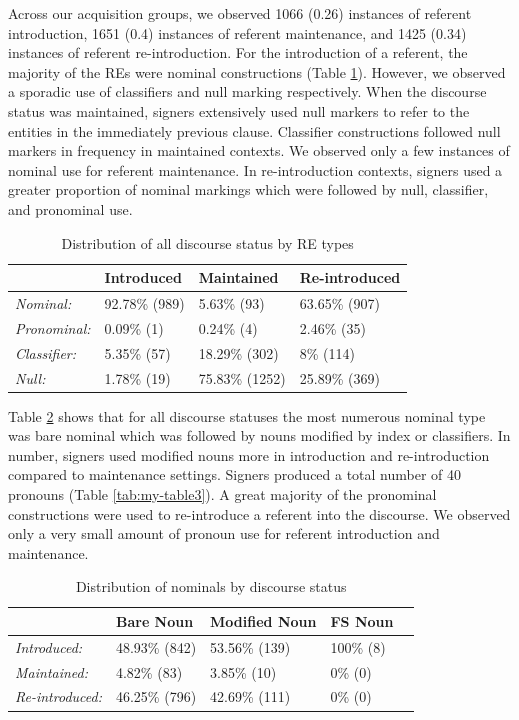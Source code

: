 \documentclass[]{elsarticle} %
\begin{document}
Across our acquisition groups, we observed 1066 (0.26) instances of
referent introduction, 1651 (0.4) instances of referent maintenance, and
1425 (0.34) instances of referent re-introduction. For the introduction
of a referent, the majority of the REs were nominal constructions (Table
\ref{tab:my-table}). However, we observed a sporadic use of classifiers
and null marking respectively. When the discourse status was maintained,
signers extensively used null markers to refer to the entities in the
immediately previous clause. Classifier constructions followed null
markers in frequency in maintained contexts. We observed only a few
instances of nominal use for referent maintenance. In re-introduction
contexts, signers used a greater proportion of nominal markings which
were followed by null, classifier, and pronominal use.

\begin{table}
\small
\caption{Distribution of all discourse status by RE types}
\label{tab:my-table}
\begin{tabular}{llll}
\hline
                     & Introduced    & Maintained     & Re-introduced \\ \hline
\textit{Nominal:}    & 92.78\% (989) & 5.63\% (93)    & 63.65\% (907) \\
\textit{Pronominal:} & 0.09\% (1)    & 0.24\% (4)     & 2.46\% (35)   \\
\textit{Classifier:} & 5.35\% (57)   & 18.29\% (302)  & 8\% (114)     \\
\textit{Null:}       & 1.78\% (19)   & 75.83\% (1252) & 25.89\% (369) \\ \hline
\end{tabular}%
\end{table}

Table \ref{tab:my-table2} shows that for all discourse statuses the most
numerous nominal type was bare nominal which was followed by nouns
modified by index or classifiers. In number, signers used modified nouns
more in introduction and re-introduction compared to maintenance
settings. Signers produced a total number of 40 pronouns (Table
\ref{tab:my-table3}). A great majority of the pronominal constructions
were used to re-introduce a referent into the discourse. We observed
only a very small amount of pronoun use for referent introduction and
maintenance.

\begin{table}
\small
\caption{Distribution of nominals by discourse status}
\label{tab:my-table2}
\begin{tabular}{lllll}
\hline
                        & Bare Noun  & Modified Noun & FS Noun \\ \hline
\textit{Introduced:}    & 48.93\% (842) & 53.56\% (139)     & 100\% (8) \\
\textit{Maintained:}    & 4.82\% (83)  & 3.85\% (10)      & 0\% (0) \\
\textit{Re-introduced:} & 46.25\% (796) & 42.69\% (111)     & 0\% (0) \\ \hline
\end{tabular}
\end{table}
\end{document}
